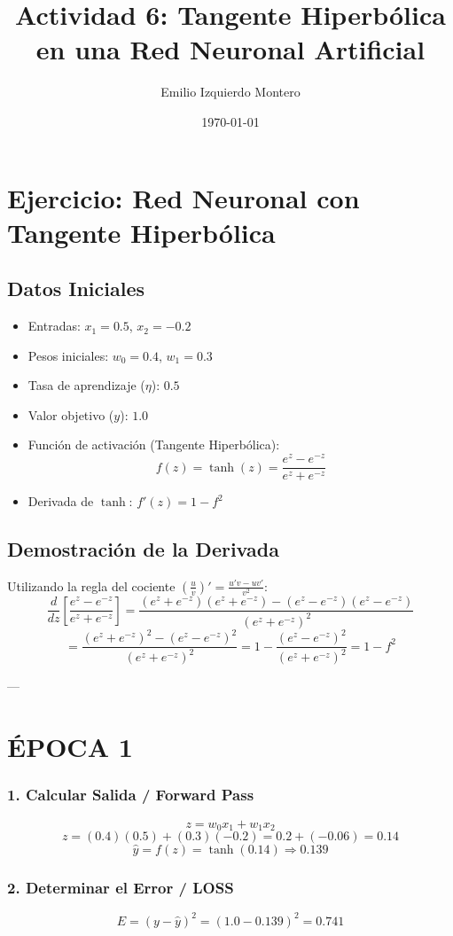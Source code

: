 \documentclass{article}
\title{Actividad 6: Tangente Hiperbólica en una Red Neuronal Artificial}
\author{Emilio Izquierdo Montero}
\date{\today}
\begin{document}
\section*{Ejercicio: Red Neuronal con Tangente Hiperbólica}

\subsection*{Datos Iniciales}
\begin{itemize}
    \item Entradas: $x_{1} = 0.5$, $x_{2} = -0.2$
    \item Pesos iniciales: $w_{0} = 0.4$, $w_{1} = 0.3$
    \item Tasa de aprendizaje ($\eta$): $0.5$
    \item Valor objetivo ($y$): $1.0$
    \item Función de activación (Tangente Hiperbólica): 
    \[ f(z) = \tanh(z) = \frac{e^{z}-e^{-z}}{e^{z}+e^{-z}} \]
    \item Derivada de $\tanh$: $f'(z) = 1 - f^2$
\end{itemize}

\subsection*{Demostración de la Derivada}
Utilizando la regla del cociente $\left(\frac{u}{v}\right)' = \frac{u'v - uv'}{v^2}$:
\[ \frac{d}{dz}\left[\frac{e^{z}-e^{-z}}{e^{z}+e^{-z}}\right] = \frac{(e^{z}+e^{-z})(e^{z}+e^{-z}) - (e^{z}-e^{-z})(e^{z}-e^{-z})}{(e^{z}+e^{-z})^2} \]
\[ = \frac{(e^{z}+e^{-z})^2 - (e^{z}-e^{-z})^2}{(e^{z}+e^{-z})^2} = 1 - \frac{(e^{z}-e^{-z})^2}{(e^{z}+e^{-z})^2} = 1 - f^2 \]

---

\section*{ÉPOCA 1}

\subsubsection*{1. Calcular Salida / Forward Pass}
\[ z = w_{0}x_{1} + w_{1}x_{2} \]
\[ z = (0.4)(0.5) + (0.3)(-0.2) = 0.2 + (-0.06) = 0.14 \]
\[ \hat{y} = f(z) = \tanh(0.14) \Rightarrow 0.139 \]

\subsubsection*{2. Determinar el Error / LOSS}
\[ E = (y - \hat{y})^2 = (1.0 - 0.139)^2 = 0.741 \]
\end{document}
